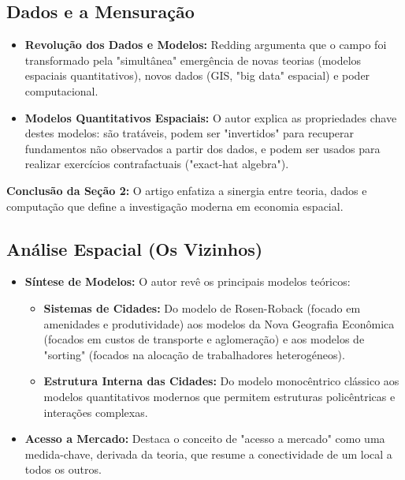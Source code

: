 \documentclass[12pt, a4paper]{article}
\begin{document}
\subsection{Dados e a Mensuração}

\begin{itemize}
    \item \textbf{Revolução dos Dados e Modelos:} Redding argumenta que o campo foi transformado pela "simultânea" emergência de novas teorias (modelos espaciais quantitativos), novos dados (GIS, "big data" espacial) e poder computacional.
    \item \textbf{Modelos Quantitativos Espaciais:} O autor explica as propriedades chave destes modelos: são tratáveis, podem ser "invertidos" para recuperar fundamentos não observados a partir dos dados, e podem ser usados para realizar exercícios contrafactuais ("exact-hat algebra").
\end{itemize}

\noindent\textbf{Conclusão da Seção 2:} O artigo enfatiza a sinergia entre teoria, dados e computação que define a investigação moderna em economia espacial.

\subsection{Análise Espacial (Os Vizinhos)}

\begin{itemize}
    \item \textbf{Síntese de Modelos:} O autor revê os principais modelos teóricos:
        \begin{itemize}
            \item \textbf{Sistemas de Cidades:} Do modelo de Rosen-Roback (focado em amenidades e produtividade) aos modelos da Nova Geografia Econômica (focados em custos de transporte e aglomeração) e aos modelos de "sorting" (focados na alocação de trabalhadores heterogéneos).
            \item \textbf{Estrutura Interna das Cidades:} Do modelo monocêntrico clássico aos modelos quantitativos modernos que permitem estruturas policêntricas e interações complexas.
        \end{itemize}
    \item \textbf{Acesso a Mercado:} Destaca o conceito de "acesso a mercado" como uma medida-chave, derivada da teoria, que resume a conectividade de um local a todos os outros.
\end{itemize}
\end{document}
